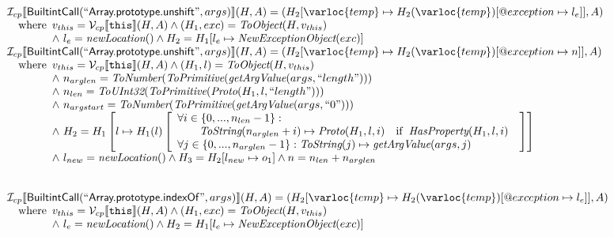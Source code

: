 \[
\begin{array}{l}

\I _{cp}\lbr \SF{BuiltintCall}(``\SF{Array.prototype.unshift}",args)\rbr(H,A)
 = (H_2[\varloc{temp}\mapsto H_2(\varloc{temp})[\varprop{exception}\mapsto l_e]], A) \\
\quad\wherec{
  v_{this} = \V _{cp}\lbr \TT{this}\rbr (H,A) \land (H_1,exc) = \hf{ToObject}(H,v_{this})\\
  \land\ l_e = \hf{newLocation}() \land H_2=H_1[l_e\mapsto\hf{NewExceptionObject}(exc)] 
  }\\

\I _{cp}\lbr \SF{BuiltintCall}(``\SF{Array.prototype.unshift}",args)\rbr(H,A)
 = (H_2[\varloc{temp}\mapsto H_2(\varloc{temp})[\varprop{exception}\mapsto n]], A) \\
\quad\wherec{
  v_{this} = \V _{cp}\lbr \TT{this}\rbr (H,A) \land (H_1,l) = \hf{ToObject}(H,v_{this})\\
  \land\ n_{arglen} = \hf{ToNumber}(\hf{ToPrimitive}(\hf{getArgValue}(args, ``length")))\\
  \land\ n_{len} = \hf{ToUInt32}(\hf{ToPrimitive}(\hf{Proto}(H_1, l, ``length")))\\
  \land\ n_{argstart} = \hf{ToNumber}(\hf{ToPrimitive}(\hf{getArgValue}(args, ``0")))\\
  \land\ H_2 = H_1\left[l \mapsto H_1(l)\left[
    \begin{array}{l}
      \forall i \in \{0,...,n_{len}-1\}:\\
        \quad\quad\hf{ToString}(n_{arglen}+i) \mapsto \hf{Proto}(H_1, l, i)
        \quad\ifc{\hf{HasProperty}(H_1,l,i)}\\
      \forall j \in \{0,...,n_{arglen}-1\}:\hf{ToString}(j) \mapsto \hf{getArgValue}(args,j)
    \end{array}
    \right]\right]\\
  \land\ l_{new} = \hf{newLocation}() \land H_3 = H_2[l_{new} \mapsto o_1] \land n = n_{len} + n_{arglen}
  }\\
\\\\



\I _{cp}\lbr \SF{BuiltintCall}(``\SF{Array.prototype.indexOf}",args)\rbr(H,A)
 = (H_2[\varloc{temp}\mapsto H_2(\varloc{temp})[\varprop{exception}\mapsto l_e]], A) \\
\quad\wherec{
  v_{this} = \V _{cp}\lbr \TT{this}\rbr (H,A) \land (H_1,exc) = \hf{ToObject}(H,v_{this})\\
  \land\ l_e = \hf{newLocation}() \land H_2=H_1[l_e\mapsto\hf{NewExceptionObject}(exc)] 
  }\\
  

\end{array}\]
